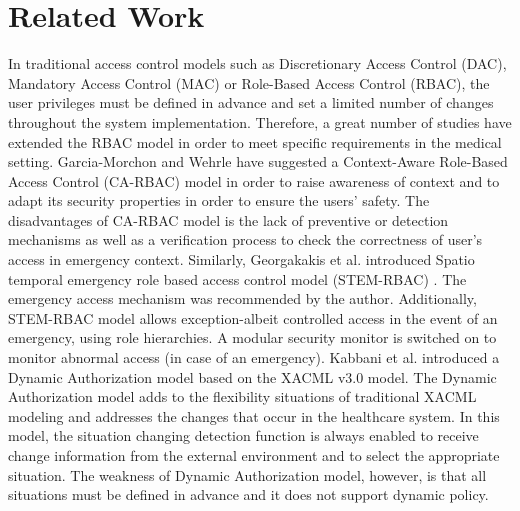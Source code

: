\section{Related Work}\label{sec:prior}

In traditional access control models such as Discretionary Access Control (DAC), Mandatory Access Control (MAC) or Role-Based Access Control (RBAC), the user privileges must be defined in advance and set a limited number of changes throughout the system implementation.
Therefore, a great number of studies have extended the RBAC model in order to meet specific requirements in the medical setting. 
Garcia-Morchon and Wehrle  have suggested a Context-Aware Role-Based Access Control (CA-RBAC) model \cite{garcia2010modular} in order to raise awareness of context and to adapt its security properties in order to ensure the users' safety. 
The disadvantages of CA-RBAC model is the lack of preventive or detection mechanisms as well as a verification process to check the correctness of user's access in emergency context.
Similarly, Georgakakis et al. introduced Spatio temporal emergency role based access control model (STEM-RBAC) \cite{georgakakis2011spatio}. 
The emergency access mechanism was recommended by the author.
Additionally, STEM-RBAC model allows exception-albeit controlled access in the event of an emergency, using role hierarchies.
A modular security monitor is switched on to monitor abnormal access (in case of an emergency). 
Kabbani et al. \cite{kabbani2014specification}  introduced a Dynamic Authorization model based on the XACML v3.0 model. 
The Dynamic Authorization model adds to the flexibility situations of traditional XACML modeling and addresses the changes that occur in the healthcare system.
In this model, the situation changing detection function is always enabled to receive change information from the external environment and to select the appropriate situation. 
The weakness of Dynamic Authorization model, however, is that all situations must be defined in advance and it does not support dynamic policy.

